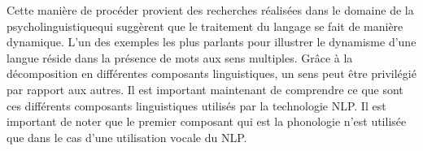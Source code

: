 \documentclass{rapport}
\begin{document}
Cette manière de procéder provient des recherches réalisées dans le domaine de la psycholinguistique\footnotemark[1] qui suggèrent que le traitement du langage se fait de manière dynamique. L'un des exemples les plus parlants pour illustrer le dynamisme d'une langue réside dans la présence de mots aux sens multiples. Grâce à la décomposition en différentes composants linguistiques\footnotemark[2], un sens peut être privilégié par rapport aux autres. Il est important maintenant de comprendre ce que sont ces différents composants linguistiques utilisés par la technologie NLP. Il est important de noter que le premier composant qui est la phonologie n'est utilisée que dans le cas d'une utilisation vocale du NLP. 

\newpage
\end{document}
